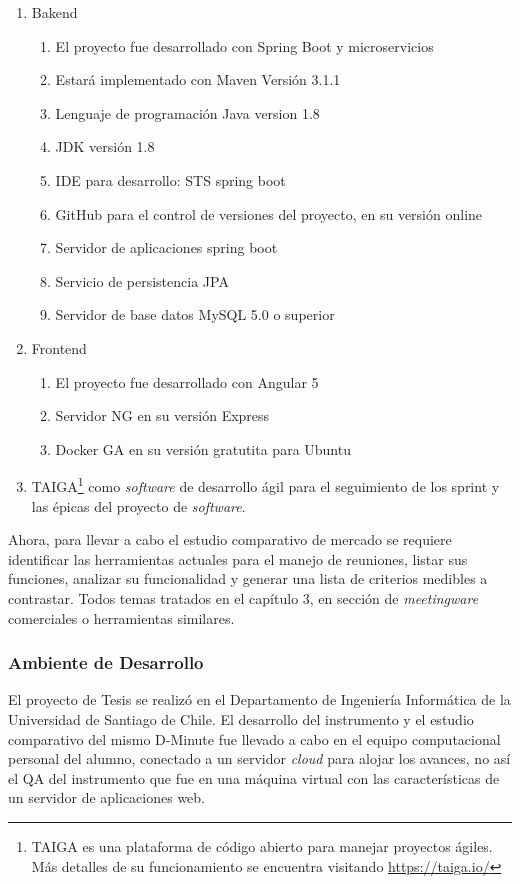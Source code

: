 \begin{enumerate}[A]
    \item Bakend
    \begin{enumerate}[a]
		\item El proyecto fue desarrollado con Spring Boot y microservicios
		\item Estará implementado con Maven Versión 3.1.1
		\item Lenguaje de programación Java version 1.8
		\item JDK versión 1.8
		\item IDE para desarrollo: STS spring boot
		\item GitHub para el control de versiones del proyecto, en su versión online
		\item Servidor de aplicaciones spring boot
		\item Servicio de persistencia JPA
		\item Servidor de base datos MySQL 5.0 o superior
    \end{enumerate}
    \item Frontend
    \begin{enumerate}[a]
		\item El proyecto fue desarrollado con Angular 5
		\item Servidor NG en su versión Express
		\item Docker GA en su versión gratutita para Ubuntu
    \end{enumerate}    
    \item TAIGA\footnote{TAIGA es una plataforma de código abierto para manejar proyectos ágiles. Más detalles de su funcionamiento se encuentra visitando \url{https://taiga.io/}} como \textit{software} de desarrollo ágil para el seguimiento de los sprint y las épicas del proyecto de \textit{software}.
\end{enumerate}

Ahora, para llevar a cabo el estudio comparativo de mercado se requiere identificar las herramientas actuales para el manejo de reuniones, listar sus funciones, analizar su funcionalidad y generar una lista de criterios medibles a contrastar. Todos temas tratados en el capítulo 3, en sección de \textit{meetingware} comerciales o herramientas similares.

\subsubsection{Ambiente de Desarrollo}

El proyecto de Tesis se realizó en el Departamento de Ingeniería Informática de la Universidad de Santiago de Chile. El desarrollo del instrumento y el estudio comparativo del mismo D-Minute fue llevado a cabo en el equipo computacional personal del alumno, conectado a un servidor \textsl{cloud} para alojar los avances, no así el QA del instrumento que fue en una máquina virtual con las características de un servidor de aplicaciones web.

